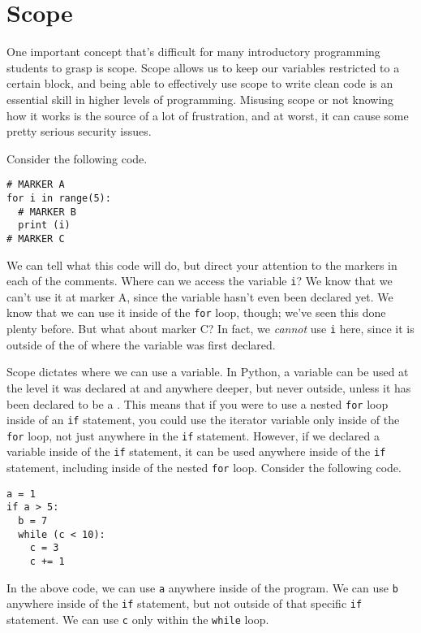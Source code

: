 \section{Scope}
One important concept that's difficult for many introductory programming students to grasp is scope. Scope allows us to keep our variables restricted to a certain block, and being able to effectively use scope to write clean code is an essential skill in higher levels of programming. Misusing scope or not knowing how it works is the source of a lot of frustration, and at worst, it can cause some pretty serious security issues.\par
Consider the following code.\par
\begin{lstlisting}[style=pippython]
# MARKER A
for i in range(5):
  # MARKER B
  print (i)
# MARKER C
\end{lstlisting}
We can tell what this code will do, but direct your attention to the markers in each of the comments. Where can we access the variable \verb|i|? We know that we can't use it at marker A, since the variable hasn't even been declared yet. We know that we can use it inside of the \verb|for| loop, though; we've seen this done plenty before. But what about marker C? In fact, we \textit{cannot} use \verb|i| here, since it is outside of the  of where the variable was first declared.\par
Scope dictates where we can use a variable. In Python, a variable can be used at the level it was declared at and anywhere deeper, but never outside, unless it has been declared to be a . This means that if you were to use a nested \verb|for| loop inside of an \verb|if| statement, you could use the iterator variable only inside of the \verb|for| loop, not just anywhere in the \verb|if| statement. However, if we declared a variable inside of the \verb|if| statement, it can be used anywhere inside of the \verb|if| statement, including inside of the nested \verb|for| loop. Consider the following code.\par
\begin{lstlisting}[style=pippython]
a = 1
if a > 5:
  b = 7
  while (c < 10):
    c = 3
    c += 1
\end{lstlisting}
In the above code, we can use \verb|a| anywhere inside of the program. We can use \verb|b| anywhere inside of the \verb|if| statement, but not outside of that specific \verb|if| statement. We can use \verb|c| only within the \verb|while| loop.\par
